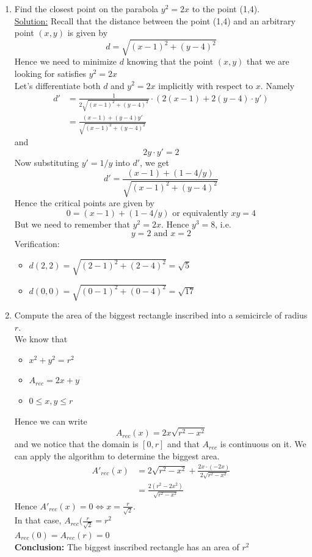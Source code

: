 \documentclass[]{article}
\begin{document}
	\begin{enumerate}
		\item Find the closest point on the parabola $y^2=2x$ to the point (1,4).\\
		\underline{Solution:} Recall that the distance between the point (1,4) and an arbitrary point $(x,y)$ is given by
		$$
			d=\sqrt{(x-1)^2+(y-4)^2}
		$$
		Hence we need to minimize $d$ knowing that the point $(x,y)$ that we are looking for satisfies $y^2=2x$\\
		Let's differentiate both $d$ and $y^2=2x$ implicitly with respect to $x$. Namely
		\begin{align*}
			d'&=\frac{1}{2\sqrt{(x-1)^2+(y-4)^2}}\cdot(2(x-1)+2(y-4)\cdot y')\\
			&=\frac{(x-1)+(y-4)y'}{\sqrt{(x-1)^2+(y-4)^2}}
		\end{align*}
		and
		$$
			2y\cdot y'=2
		$$
		Now substituting $y'=1/y$ into $d'$, we get
		$$
			d'=\frac{(x-1)+(1-4/y)}{\sqrt{(x-1)^2+(y-4)^2}}
		$$
		Hence the critical points are given by
		$$
			0=(x-1)+(1-4/y)\text{ or equivalently }xy=4
		$$
		But we need to remember that $y^2=2x$. Hence $y^3=8$, i.e.
		$$
			y=2\text{ and }x=2
		$$
		Verification:
		\begin{itemize}
			\item $d(2,2)=\sqrt{(2-1)^2+(2-4)^2}=\sqrt{5}$
			\item $d(0,0)=\sqrt{(0-1)^2+(0-4)^2}=\sqrt{17}$
		\end{itemize}
		\item Compute the area of the biggest rectangle inscribed into a semicircle of radius $r$.\\
		We know that
		\begin{itemize}
			\item $x^2+y^2=r^2$
			\item $A_{rec}=2x+y$
			\item $0\le x,y\le r$
		\end{itemize}
		Hence we can write
		$$
			A_{rec}(x)=2x\sqrt{r^2-x^2}
		$$
		and we notice that the domain is $[0,r]$ and that $A_{rec}$ is continuous on it. We can apply the algorithm to determine the biggest area.
		\begin{align*}
			A'_{rec}(x)&=2\sqrt{r^2-x^2}+\frac{2x\cdot(-2x)}{2\sqrt{r^2-x^2}}\\
			&=\frac{2(r^2-2x^2)}{\sqrt{r^2-x^2}}
		\end{align*}
		Hence $A'_{rec}(x)=0\iff x=\frac{r}{\sqrt{2}}$.\\
		In that case, $A_{rec}(\frac{r}{\sqrt{2}}=r^2$\\
		$A_{rec}(0)=A_{rec}(r)=0$\\
		{\bf Conclusion:} The biggest inscribed rectangle has an area of $r^2$
	\end{enumerate}
\end{document}

